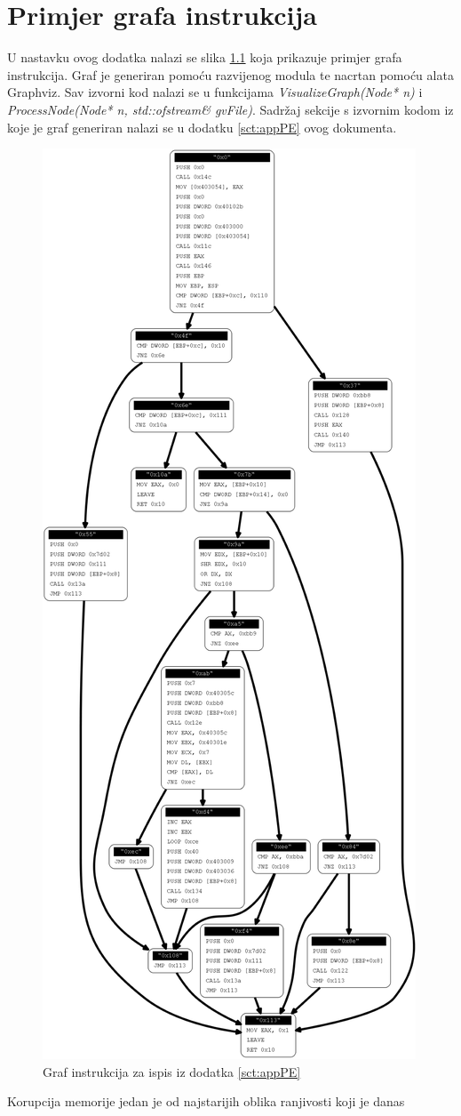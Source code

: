 \documentclass[times, utf8, diplomski, numeric]{fer}
\begin{document}
\chapter{Primjer grafa instrukcija}
\label{sct:appGraph}

U nastavku ovog dodatka nalazi se slika \ref{fig:appGraphInstr} 
koja prikazuje primjer grafa instrukcija. Graf je generiran
pomoću razvijenog modula te nacrtan pomoću alata Graphviz. Sav izvorni kod nalazi se u
funkcijama \emph{VisualizeGraph(Node* n)} i
\emph{ProcessNode(Node* n, std::ofstream\& gvFile)}. Sadržaj
sekcije s izvornim kodom iz koje je graf generiran nalazi se u
dodatku \ref{sct:appPE} ovog dokumenta.

\begin{figure}[htb]
\centering
\setlength\fboxsep{0pt}
\setlength\fboxrule{0.5pt}
\includegraphics[width=\textwidth, height=\textheight]{slike/AD_CM1_graph}
\caption{Graf instrukcija za ispis iz dodatka \ref{sct:appPE}}
\label{fig:appGraphInstr} 
\end{figure}
\clearpage

\begin{sazetak}
Korupcija memorije jedan je od najstarijih oblika ranjivosti koji
je danas 
\end{sazetak}
\end{document}
